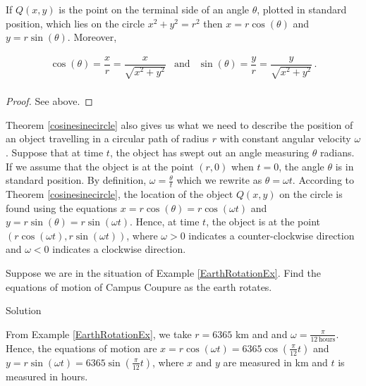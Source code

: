 \begin{theorem}  \label{cosinesinecircle} 
If $Q(x,y)$ is the point on the terminal side of an angle $\theta$, plotted in standard position, which lies on the circle $x^2+y^2 = r^2$ then $x = r \cos(\theta)$ and $y = r \sin(\theta)$.  Moreover,   

\[\begin{array}{ccc} \cos(\theta)= \dfrac{x}{r}  = \dfrac{x}{\sqrt{x^2+y^2}} & \text{and} &  \sin(\theta) = \dfrac{y}{r} = \dfrac{y}{\sqrt{x^2+y^2}}\,. \\ \end{array} \]

\end{theorem}
\ifanalysis
\begin{proof}
See above.
\end{proof}
\fi


Theorem \ref{cosinesinecircle} also gives us what we need to describe the position of an object travelling in a circular path of radius $r$ with constant angular velocity $\omega$.  Suppose that at time $t$, the object has swept out an angle measuring $\theta$ radians.  If we assume that the object is at the point $(r,0)$ when $t=0$, the angle $\theta$ is in standard position.  By definition, $\omega = \frac{\theta}{t}$ which we rewrite as  $\theta = \omega t$.  According to Theorem \ref{cosinesinecircle}, the location of the object $Q(x,y)$ on the circle is found using the equations  $x = r \cos(\theta) = r \cos(\omega t)$ and $y = r \sin(\theta) = r \sin(\omega t)$.  Hence, at time $t$, the object is at the point $(r \cos(\omega t), r \sin(\omega t))$, where  $\omega > 0$ indicates a counter-clockwise direction and $\omega < 0$ indicates a clockwise direction.

\ifcourse
\begin{example}
 Suppose we are in the situation of Example \ref{EarthRotationEx}.  Find the equations of motion of Campus Coupure as the earth rotates.
\label{Lakelandrotates}

Solution 

  From Example \ref{EarthRotationEx}, we take $r = 6365$ km and and $\omega = \frac{\pi}{12 \, \text{hours}}$.  Hence, the equations of motion are $x =  r \cos(\omega t) = 6365 \cos\left(\frac{\pi}{12} t\right)$ and  $y =  r \sin(\omega t) = 6365 \sin\left(\frac{\pi}{12} t\right)$, where $x$ and $y$ are measured in km and $t$ is measured in hours. 
\end{example}

